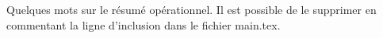 
Quelques mots sur le résumé opérationnel. Il est possible de le supprimer en commentant la ligne d’inclusion dans le fichier main.tex.